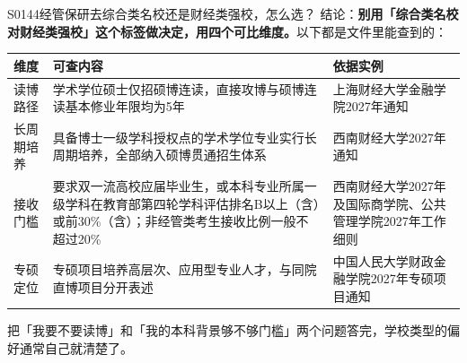 \begin{qa}{S0144}{经管保研去综合类名校还是财经类强校，怎么选？}
结论：\textbf{别用「综合类名校对财经类强校」这个标签做决定，用四个可比维度。}以下都是文件里能查到的：

\par\vspace{2pt}\nobreak\begin{center}\footnotesize
\begin{tabularx}{\textwidth}{>{\raggedright\arraybackslash}X>{\raggedright\arraybackslash}X>{\raggedright\arraybackslash}X}
\toprule
\textbf{维度} & \textbf{可查内容} & \textbf{依据实例} \\ \midrule
读博路径 & 学术学位硕士仅招硕博连读，直接攻博与硕博连读基本修业年限均为5年 & 上海财经大学金融学院2027年通知 \\
长周期培养 & 具备博士一级学科授权点的学术学位专业实行长周期培养，全部纳入硕博贯通招生体系 & 西南财经大学2027年通知 \\
接收门槛 & 要求双一流高校应届毕业生，或本科专业所属一级学科在教育部第四轮学科评估排名B以上（含）或前30\%（含）；非经管类考生接收比例一般不超过20\% & 西南财经大学2027年及国际商学院、公共管理学院2027年工作细则 \\
专硕定位 & 专硕项目培养高层次、应用型专业人才，与同院直博项目分开表述 & 中国人民大学财政金融学院2027年专硕项目通知 \\
\bottomrule
\end{tabularx}
\end{center}\vspace{2pt}\par

把「我要不要读博」和「我的本科背景够不够门槛」两个问题答完，学校类型的偏好通常自己就清楚了。
\end{qa}

